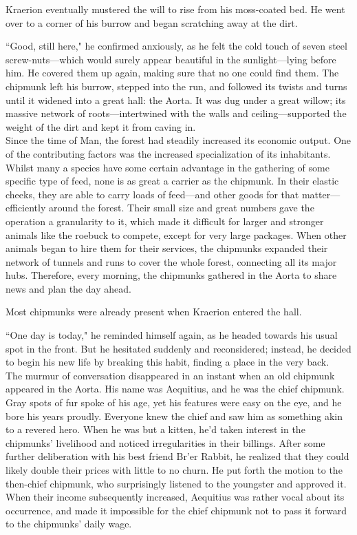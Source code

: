 Kraerion eventually mustered the will to rise from his moss-coated bed.
He went over to a corner of his burrow and began scratching away at the dirt.

``Good, still here," he confirmed anxiously, as he felt the cold touch of seven steel screw-nuts---which would surely appear beautiful in the sunlight---lying before him.
He covered them up again, making sure that no one could find them.
The chipmunk left his burrow, stepped into the run, and followed its twists and turns until it widened into a great hall: the Aorta.
It was dug under a great willow; its massive network of roots---intertwined with the walls and ceiling---supported the weight of the dirt and kept it from caving in.\\

Since the time of Man, the forest had steadily increased its economic output.
One of the contributing factors was the increased specialization of its inhabitants.
Whilst many a species have some certain advantage in the gathering of some specific type of feed, none is as great a carrier as the chipmunk.
In their elastic cheeks, they are able to carry loads of feed---and other goods for that matter---efficiently around the forest.
Their small size and great numbers gave the operation a granularity to it, which made it difficult for larger and stronger animals like the roebuck to compete, except for very large packages.
When other animals began to hire them for their services, the chipmunks expanded their network of tunnels and runs to cover the whole forest, connecting all its major hubs.
Therefore, every morning, the chipmunks gathered in the Aorta to share news and plan the day ahead.

Most chipmunks were already present when Kraerion entered the hall.

``One day is today," he reminded himself again, as he headed towards his usual spot in the front.
But he hesitated suddenly and reconsidered; instead, he decided to begin his new life by breaking this habit, finding a place in the very back.\\

The murmur of conversation disappeared in an instant when an old chipmunk appeared in the Aorta.
His name was Aequitius, and he was the chief chipmunk.
Gray spots of fur spoke of his age, yet his features were easy on the eye, and he bore his years proudly.
Everyone knew the chief and saw him as something akin to a revered hero.
When he was but a kitten, he'd taken interest in the chipmunks' livelihood and noticed irregularities in their billings.
After some further deliberation with his best friend Br'er Rabbit, he realized that they could likely double their prices with little to no churn.
He put forth the motion to the then-chief chipmunk, who surprisingly listened to the youngster and approved it.
When their income subsequently increased, Aequitius was rather vocal about its occurrence, and made it impossible for the chief chipmunk not to pass it forward to the chipmunks' daily wage.


